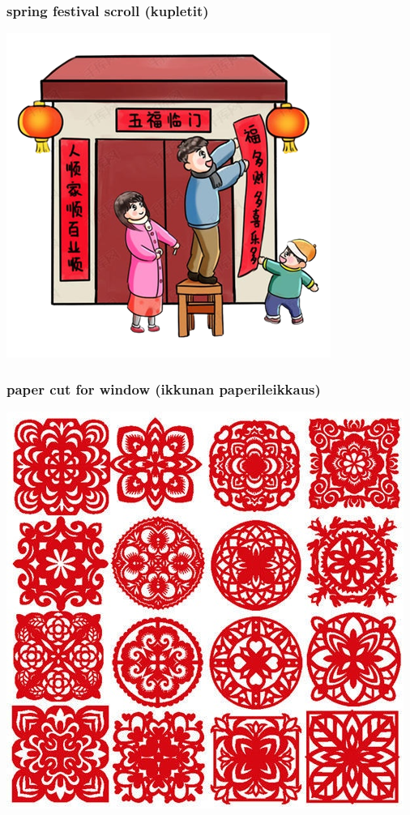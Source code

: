 \documentclass[17pt]{beamer}
\begin{document}
\begin{frame}
  \frametitle{spring festival scroll (kupletit)}
  \begin{center}
    \includegraphics[width=.7\textwidth]{./images/chunlian}
  \end{center}
\end{frame}

\begin{frame}
  \frametitle{paper cut for window (ikkunan paperileikkaus)}
  \begin{center}
    \includegraphics[width=.6\textwidth]{./images/chuanghua1}
  \end{center}
\end{frame}

\end{document}
